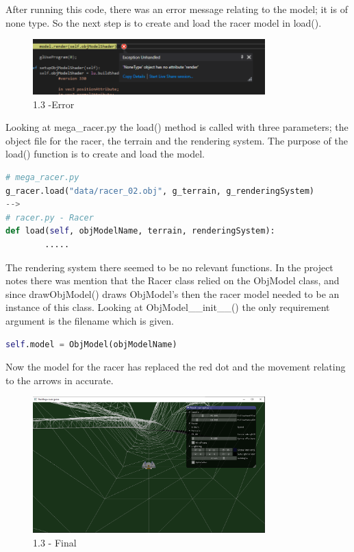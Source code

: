 \documentclass[a4 paper, 12pt]{article}
\begin{document}
After running this code, there was an error message relating to the model; it is of none type. So the next step is to create and load the racer model in load(). 
    \begin{figure} [H]
        \centering
        \includegraphics[width=0.8\textwidth, frame]
            {./images/1.3_a.PNG}
        \caption{1.3 -Error}
    \end{figure}

Looking at mega\_racer.py the load() method is called with three parameters; the object file for the racer, the terrain and the rendering system. The purpose of the load() function is to create and load the model. 
    \begin{lstlisting}[language=python]
# mega_racer.py
g_racer.load("data/racer_02.obj", g_terrain, g_renderingSystem)
-->
# racer.py - Racer
def load(self, objModelName, terrain, renderingSystem):
        .....    
    \end{lstlisting}

The rendering system there seemed to be no relevant functions. In the project notes there was mention that the Racer class relied on the ObjModel class, and since drawObjModel() draws ObjModel's then the racer model needed to be an instance of this class. Looking at ObjModel\_\_init\_\_() the only requirement argument is the filename which is given.
    \begin{lstlisting}[language=python]
    self.model = ObjModel(objModelName)
    \end{lstlisting}   

Now the model for the racer has replaced the red dot and the movement relating to the arrows in accurate.
\begin{figure} [H]
    \centering
    \includegraphics[width=0.8\textwidth, frame]
        {./images/1.3_b.PNG}
    \caption{1.3 - Final}
\end{figure}
\end{document}
